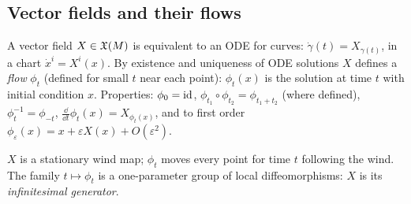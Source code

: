 \subsection{Vector fields and their flows}
\begin{formal}
A vector field $X\in\mathfrak{X}(M)$ is equivalent to an ODE for curves: $\dot\gamma(t)=X_{\gamma(t)}$, \ie in a chart $\dot x^i=X^i(x)$. By existence and uniqueness of ODE solutions $X$ defines a \emph{flow} $\phi_t$ (defined for small $t$ near each point): $\phi_t(x)$ is the solution at time $t$ with initial condition $x$. Properties: $\phi_0=\mathrm{id}$, $\phi_{t_1}\circ\phi_{t_2}=\phi_{t_1+t_2}$ (where defined), $\phi_t^{-1}=\phi_{-t}$, $\frac{\dd}{\dd t}\phi_t(x)=X_{\phi_t(x)}$, and to first order $\phi_\varepsilon(x)=x+\varepsilon X(x)+O(\varepsilon^2)$.
\end{formal}
\begin{intuition}
$X$ is a stationary wind map; $\phi_t$ moves every point for time $t$ following the wind. The family $t\mapsto\phi_t$ is a one-parameter group of local diffeomorphisms: $X$ is its \emph{infinitesimal generator}.
\end{intuition}
